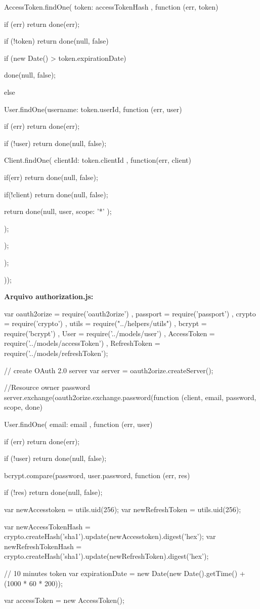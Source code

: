 \begin{flushleft}
{		AccessToken.findOne({ token: accessTokenHash }, function (err, token) {
			if (err) return done(err);
			
			if (!token) return done(null, false)
			
			if (new Date() > token.expirationDate) {
				done(null, false);
				
			} else {
			User.findOne({username: token.userId}, function (err, user) {
				if (err)
				return done(err);
				
				if (!user)
				return done(null, false);
				
				Client.findOne({ clientId: token.clientId }, function(err, client) {
					if(err)
					return done(null, false);
					
					if(!client)
					return done(null, false);
					
					return done(null, user, { scope: '*' });
				});
			});
		}
	});
}
));

\textbf{Arquivo authorization.js:}

var oauth2orize = require('oauth2orize')
, passport = require('passport')
, crypto = require('crypto')
, utils = require("../helpers/utils")
, bcrypt = require('bcrypt')
, User = require('../models/user')
, AccessToken = require('../models/accessToken')
, RefreshToken = require('../models/refreshToken');

// create OAuth 2.0 server
var server = oauth2orize.createServer();

//Resource owner password
server.exchange(oauth2orize.exchange.password(function (client, email, password, scope, done) {
	User.findOne({ email: email }, function (err, user) {
		if (err)
		return done(err);
		
		if (!user)
		return done(null, false);
		
		bcrypt.compare(password, user.password, function (err, res) {
			if (!res)
			return done(null, false);
			
			var newAccesstoken = utils.uid(256);
			var newRefreshToken = utils.uid(256);
			
			var newAccessTokenHash = crypto.createHash('sha1').update(newAccesstoken).digest('hex');
			var newRefreshTokenHash = crypto.createHash('sha1').update(newRefreshToken).digest('hex');
			
			// 10 minutes token
			var expirationDate = new Date(new Date().getTime() + (1000 * 60 * 200));
			
			var accessToken = new AccessToken();
			
}}}
\end{flushleft}
